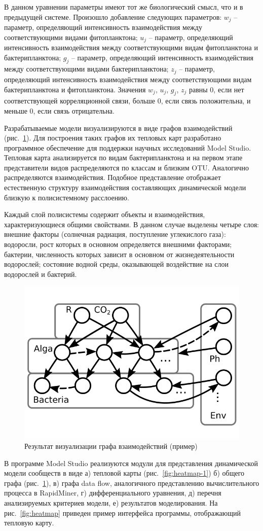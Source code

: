 \documentclass[a4paper,12pt,openany,final]{extreport}
\def\oldcaption{} \let\oldcaption=\caption
\def\caption{\stepcounter{captionsnum}\oldcaption}
\begin{document}
В данном уравнении параметры имеют тот же биологический смысл, что и в
предыдущей системе. Произошло добавление следующих параметров: \(w_{j}\)
-- параметр, определяющий интенсивность взаимодействия между
соответствующими видами фитопланктона; \(u_{j}\) -- параметр,
определяющий интенсивность взаимодействия между соответствующими видам
фитопланктона и бактерипланктона; \(g_{j}\) -- параметр, определяющий
интенсивность взаимодействия между соответствующими видами
бактерипланктона; \(z_{j}\) -- параметр, определяющий интенсивность
взаимодействия между соответствующими видам бактерипланктона и
фитопланктона. Значения \(w_{j}\), \(u_{j}\), \(g_{j}\), \(z_{j}\) равны 0, если
нет соответствующей корреляционной связи, больше 0, если связь
положительна, и меньше 0, если связь отрицательна.

Разрабатываемые модели визуализируются в виде графов взаимодействий
(рис.~\ref{fig:graph}). Для построения таких графов их тепловых карт разработано
программное обеспечение для поддержки научных исследований Model Studio.
Тепловая карта анализируется по видам бактерипланктона и на первом этапе
представители видов распределяются по классам и близким OTU. Аналогично
распределяются взаимодействия. Подобное представление отображает
естественную структуру взаимодействия составляющих динамической модели
близкую к полисистемному расслоению.

Каждый слой полисистемы содержит объекты и взаимодействия,
характеризующиеся общими свойствами. В данном случае выделены четыре
слоя: внешние факторы (солнечная радиация, поступление углекислого
газа): водоросли, рост которых в основном определяется внешними
факторами; бактерии, численность которых зависит в основном от
жизнедеятельности водорослей; состояние водной среды, оказывающей
воздействие на слои водорослей и бактерий.

\begin{figure}\centering
\includegraphics[width=0.3\linewidth]{media/image20.png}

\caption{Результат визуализации графа взаимодействий (пример)}\label{fig:graph}
\end{figure}

В программе Model Studio реализуются модули для представления
динамической модели сообществ в виде а) тепловой карты (рис.~\ref{fig:heatmap-1}) б)
общего графа (рис.~\ref{fig:graph}), в) графа data flow, аналогичного представлению
вычислительного процесса в RapidMiner, г) дифференциального уравнения,
д) перечня анализируемых критериев модели, е) результатов моделирования.
На рис.~\ref{fig:heatmap} приведен пример интерфейса программы, отображающий тепловую
карту.
\end{document}
